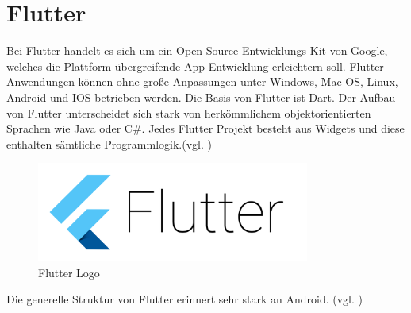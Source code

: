 \section{Flutter}
Bei Flutter handelt es sich um ein Open Source Entwicklungs Kit von Google, welches die Plattform übergreifende App Entwicklung erleichtern soll. Flutter Anwendungen können ohne große Anpassungen unter Windows, Mac OS, Linux, Android und IOS betrieben werden. Die Basis von Flutter ist Dart. Der Aufbau von Flutter unterscheidet sich stark von herkömmlichem objektorientierten Sprachen wie Java oder C\#. Jedes Flutter Projekt besteht aus Widgets und diese enthalten sämtliche Programmlogik.(vgl. \cite{Flutter})

\begin{figure}[h]
\centering
\vspace{0.5cm}
\includegraphics[width=0.8\textwidth]{FLUTTER/images/ZB/flutter_logo.png}
\caption{Flutter Logo \cite{Flutter-Logo}}
\end{figure}

\newpage

Die generelle Struktur von Flutter erinnert sehr stark an Android. (vgl. \cite{Flutter-Architektur})

